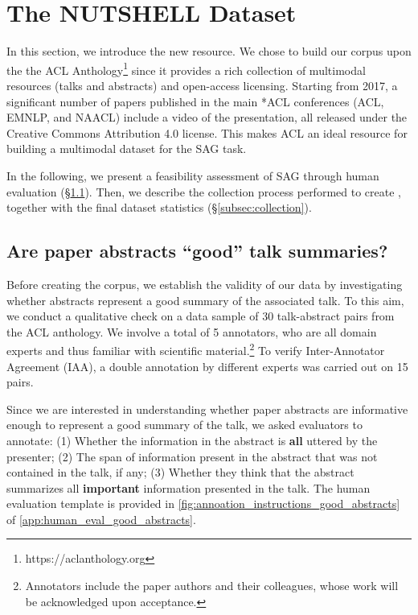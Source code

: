 \section{The NUTSHELL Dataset}
\label{sec:dataset}
In this section, we introduce the new \DATASETNAME{} resource. We chose 
to build our corpus upon the
the ACL Anthology\footnote{\label{footnote_acl}https://aclanthology.org} 
since it provides a rich collection of multimodal resources (talks and abstracts) and open-access licensing. Starting from 2017, a significant number of papers published in the main *ACL conferences (ACL, EMNLP, and NAACL) include a video of the presentation, all released under the Creative Commons Attribution 4.0 license. This makes ACL an ideal resource for building a multimodal dataset 
for the SAG task.

In the following, we present a feasibility assessment of SAG through human evaluation (\S\ref{subsec:human_feasibility}). Then, we describe the collection process performed to create \DATASETNAME{}, together with the final dataset statistics (\S\ref{subsec:collection}).

 
\subsection{Are paper abstracts \enquote{good} talk summaries?}
\label{subsec:human_feasibility}
Before creating the corpus,
we establish the validity of our data by investigating 
whether abstracts represent a good summary of the associated talk. To this aim, we conduct a qualitative check on a data sample of 30 talk-abstract pairs from the ACL anthology. 
We involve a total of 5 annotators, who are all domain experts and thus familiar with scientific material.\footnote{Annotators include the paper authors and their colleagues, whose work will be acknowledged upon acceptance.}
To verify Inter-Annotator Agreement (IAA),
a double annotation by different experts was carried out on 15 pairs.


Since we are interested in understanding whether 
paper abstracts are informative enough to represent a good summary
of the talk,
we asked evaluators to annotate:
    (1) Whether the information in the abstract is \textbf{all} uttered by the presenter;
    (2) The span of information present in the abstract that was not contained in the talk, if any;
    (3) Whether they think that the abstract summarizes 
    all \textbf{important} information presented in the talk.
The human evaluation template is
provided in \cref{fig:annoation_instructions_good_abstracts} of \cref{app:human_eval_good_abstracts}.


